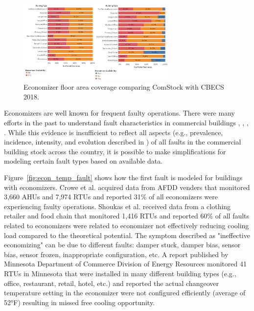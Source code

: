 \begin{figure}
  \centering \includegraphics[width=0.7\textwidth]{figures/economizer_prevalence.png}
  \caption{Economizer floor area coverage comparing ComStock with CBECS 2018.}
  \label{fig:economizer_prevalence}
\end{figure}

Economizers are well known for frequent faulty operations. There were many efforts in the past to understand fault characteristics in commercial buildings \citep{doi_10_1080_23744731_2021_1898243}, \citep{osti_1889192}, \citep{osti_1829706}, \citep{osti_1457127}. While this evidence is insufficient to reflect all aspects (e.g., prevalence, incidence, intensity, and evolution described in \citep{doi_10_1080_23744731_2021_1898243}) of all faults in the commercial building stock across the country, it is possible to make simplifications for modeling certain fault types based on available data.

Figure~\ref{fig:econ_temp_fault} shows how the first fault is modeled for buildings with economizers. Crowe et al. \citep{osti_1889192} acquired data from AFDD venders that monitored 3,660 AHUs and 7,974 RTUs and reported 31\% of all economizers were experiencing faulty operations. Shoukas et al. \citep{osti_1665808} received data from a clothing retailer and food chain that monitored 1,416 RTUs and reported 60\% of all faults related to economizers were related to economizer not effectively reducing cooling load compared to the theoretical potential. The symptom described as "ineffective economizing" can be due to different faults: damper stuck, damper bias, sensor bias, sensor frozen, inappropriate configuration, etc. A report \citep{seventhwave_rtu} published by Minnesota Department of Commerce Division of Energy Resources monitored 41 RTUs in Minnesota that were installed in many different building types (e.g., office, restaurant, retail, hotel, etc.) and reported the actual changeover temperature setting in the economizer were not configured efficiently (average of 52°F) resulting in missed free cooling opportunity.

